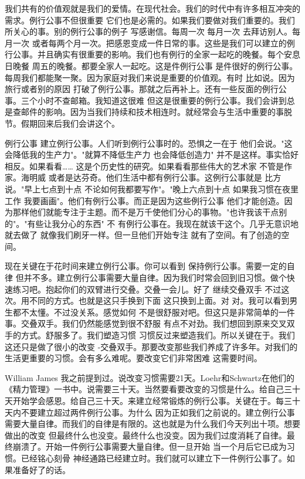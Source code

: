我们共有的价值观就是我们的爱情。在现代社会。我们的时代中有许多相互冲突的需求。例行公事不但很重要 它们也是必需的。如果我们要做对我们重要的。我们所关心的事。别的例行公事的例子 写感谢信。每周一次 每月一次 去拜访别人。每月一次 或者每两个月一次。把感恩变成一件日常的事。这些是我们可以建立的例行公事。并且确实有很重要的影响。我们也有例行的全家一起吃的晚餐。每个安息日晚餐 周五的晚餐。都要全家人一起吃。这是件例行公事 是件很好的例行公事。每周我们都能聚一聚。因为家庭对我们来说是重要的价值观。有时 比如说。因为旅行或者别的原因 打破了例行公事。那就之后再补上。还有一些反面的例行公事。三个小时不查邮箱。我知道这很难 但这是很重要的例行公事。我们会讲到总是查邮件的影响。因为当我们持续和技术相连时。就经常会与生活中重要的事脱节。假期回来后我们会讲这个。 

例行公事 建立例行公事。人们听到例行公事时的。恐惧之一在于 他们会说。"这会降低我的生产力"。"就算不降低生产力 也会降低创造力" 并不是这样。事实恰好相反。如果看看…… 这是个历史性的研究。如果看看那些伟大的艺术家 不管是作家。海明威 或者是达芬奇。他们生活中都有例行公事。这例行公事就是 比方说。"早上七点到十点 不论如何我都要写作"。"晚上六点到十点 如果我习惯在夜里工作 我要画画"。他们有例行公事。而正是因为这些例行公事 他们才能创造。因为那样他们就能专注于主题。而不是万千使他们分心的事物。"也许我该干点别的"。"有些让我分心的东西" 不 有例行公事在。我现在就该干这个。几乎无意识地就去做了 就像我们刷牙一样。但一旦他们开始专注 就有了空间。有了创造的空间。 

现在关键在于花时间来建立例行公事。你可以看到 保持例行公事。需要一定的自律 但并不多。建立例行公事需要大量自律。因为我们时常会回到旧习惯。做个快速练习吧。抱起你们的双臂进行交叠。交叠一会儿。好了 继续交叠双手 不过这次。用不同的方式。也就是这只手换到下面 这只换到上面。对 对。我可以看到男生都不太懂。不过没关系。感觉如何 不是很舒服对吧。但这只是非常简单的一件事。交叠双手。我们仍然能感觉到很不舒服 有点不对劲。我们想回到原来交叉双手的方式。舒服多了。我们塑造习惯 习惯反过来塑造我们。所以关键在于。我们这还只是做了很小的改变 -交叠双手。那要改变那些我们养成了许多年。对我们的生活更重要的习惯。会有多么难呢。要改变它们非常困难 这需要时间。 

William James 我之前提到过。说改变习惯需要21天。Loehr和Schwartz在他们的《精力管理》一书中。说需要三十天。当然要看要改变的习惯是什么。给自己三十天开始学会感恩。给自己三十天。来建立经常锻炼的例行公事。关键在于。每三十天内不要建立超过两件例行公事。为什么 因为正如我们之前说的。建立例行公事需要大量自律。而我们的自律是有限的。这也就是为什么我们今天列出十项。想要做出的改变 但最终什么也没变。最终什么也没变。因为我们过度消耗了自律。最终崩溃了。开始一件例行公事需要大量自律。但一旦开始 当一个月后它已成为习惯。已经铭心刻骨 神经通路已经建立时。我们就可以建立下一件例行公事了。如果准备好了的话。 

